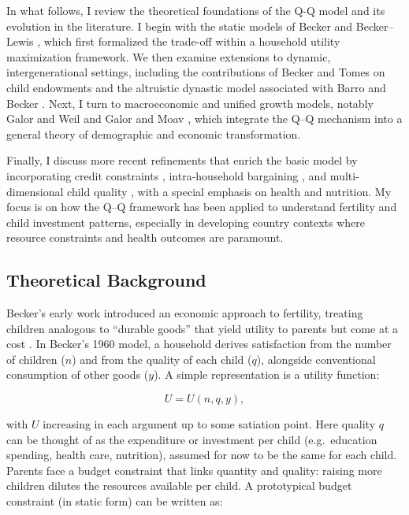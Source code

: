 \documentclass[]{AEA}
\begin{document}
In what follows, I review the theoretical foundations of the Q-Q model
and its evolution in the literature. I begin with the static models of
Becker \citep{becker1960economic} and Becker--Lewis
\citep{becker1973interaction}, which first formalized the trade-off
within a household utility maximization framework. We then examine
extensions to dynamic, intergenerational settings, including the
contributions of Becker and Tomes \citep{becker1976child} on child
endowments and the altruistic dynastic model associated with Barro and
Becker \citep{barro1989fertility}. Next, I turn to macroeconomic and
unified growth models, notably Galor and Weil
\citep{galor2000population} and Galor and Moav \citep{galor2002natural},
which integrate the Q--Q mechanism into a general theory of demographic
and economic transformation.

Finally, I discuss more recent refinements that enrich the basic model
by incorporating credit constraints \citep{doepke2004accounting},
intra-household bargaining \citep{doepke2019bargaining}, and
multi-dimensional child quality
\citep{hoddinott2013economic, kalemli2002does}, with a special emphasis
on health and nutrition. My focus is on how the Q--Q framework has been
applied to understand fertility and child investment patterns,
especially in developing country contexts where resource constraints and
health outcomes are paramount.

\subsection{Theoretical Background}

Becker's early work introduced an economic approach to fertility,
treating children analogous to ``durable goods'' that yield utility to
parents but come at a cost \citep{doepke2015gary}. In Becker's 1960
model, a household derives satisfaction from the number of children
(\(n\)) and from the quality of each child (\(q\)), alongside
conventional consumption of other goods (\(y\)). A simple representation
is a utility function:

\[
U = U(n, q, y),
\]

with \(U\) increasing in each argument up to some satiation point. Here
quality \(q\) can be thought of as the expenditure or investment per
child (e.g.~education spending, health care, nutrition), assumed for now
to be the same for each child. Parents face a budget constraint that
links quantity and quality: raising more children dilutes the resources
available per child. A prototypical budget constraint (in static form)
can be written as:
\end{document}
